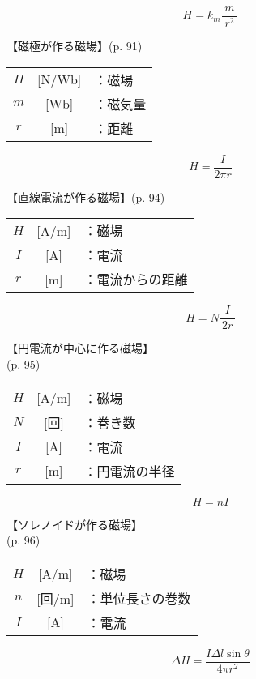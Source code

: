 \documentclass[10pt]{jarticle}
\begin{document}
\newpage
\[
H = k_m \frac{m}{\; r^2 \;}
\]


\vskip3mm
【磁極が作る磁場】{\footnotesize (p. 91)}

\begin{tabular}{ccl}
$H$	&[N/Wb]	&：磁場 \\
$m$	&[Wb]	&：磁気量 \\
$r$	&[m]	&：距離
\end{tabular}





\newpage
\[
H = \frac{I}{2 \pi r}
\]


\vskip3mm
【直線電流が作る磁場】{\footnotesize (p. 94)}

\begin{tabular}{ccl}
$H$	&[A/m]	&：磁場 \\
$I$	&[A]	&：電流 \\
$r$	&[m]	&：電流からの距離
\end{tabular}




\newpage
\[
H = N \frac{I}{\, 2 r \,}
\]


\vskip3mm
【円電流が中心に作る磁場】\\
\hfill {\footnotesize (p. 95)}

\begin{tabular}{ccl}
$H$	&[A/m]	&：磁場 \\
$N$	&[回]	&：巻き数 \\
$I$	&[A]	&：電流 \\
$r$	&[m]	&：円電流の半径
\end{tabular}





\newpage
\[
H = n I
\]


\vskip3mm
【ソレノイドが作る磁場】\\
\hfill {\footnotesize (p. 96)}

\begin{tabular}{ccl}
$H$	&[A/m]	&：磁場 \\
$n$	&[回/m]	&：単位長さの巻数\\
$I$	&[A]	&：電流 \\
\end{tabular}





\newpage
\[
\mathit{\Delta} H = \frac{I \mathit{\Delta}l \sin\theta}{4\pi r^2}
\]
\end{document}
